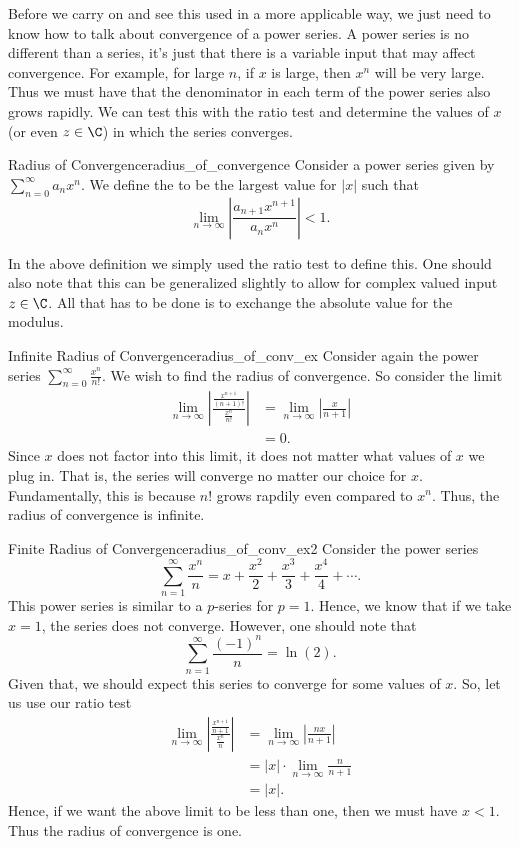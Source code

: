 Before we carry on and see this used in a more applicable way, we just need to know how to talk about convergence of a power series.  A power series is no different than a series, it's just that there is a variable input that may affect convergence.  For example, for large $n$, if $x$ is large, then $x^n$ will be very large.  Thus we must have that the denominator in each term of the power series also grows rapidly. We can test this with the ratio test and determine the values of $x$ (or even $z\in \C$) in which the series converges.

\begin{df}{Radius of Convergence}{radius_of_convergence}
Consider a power series given by $\sum_{n=0}^\infty a_n x^n$.  We define the  to be the largest value for $|x|$ such that
\[
\lim_{n\to \infty} \left| \frac{a_{n+1}x^{n+1}}{a_n x^n}\right| < 1.
\]
\end{df}

In the above definition we simply used the ratio test to define this. One should also note that this can be generalized slightly to allow for complex valued input $z\in \C$.  All that has to be done is to exchange the absolute value for the modulus.

\begin{ex}{Infinite Radius of Convergence}{radius_of_conv_ex}
Consider again the power series $\sum_{n=0}^\infty \frac{x^n}{n!}$. We wish to find the radius of convergence.  So consider the limit
\begin{align*}
    \lim_{n\to \infty} \left| \frac{\frac{x^{n+1}}{(n+1)!}}{\frac{x^n}{n!}}\right|&= \lim_{n\to \infty} \left| \frac{x}{n+1}\right|\\
    &= 0.
\end{align*}
Since $x$ does not factor into this limit, it does not matter what values of $x$ we plug in. That is, the series will converge no matter our choice for $x$. Fundamentally, this is because $n!$ grows rapdily even compared to $x^n$. Thus, the radius of convergence is infinite.
\end{ex}

\begin{ex}{Finite Radius of Convergence}{radius_of_conv_ex2}
Consider the power series
\[
\sum_{n=1}^\infty \frac{x^n}{n} = x + \frac{x^2}{2}+\frac{x^3}{3}+\frac{x^4}{4}+\cdots.
\]
This power series is similar to a $p$-series for $p=1$.  Hence, we know that if we take $x=1$, the series does not converge.  However, one should note that
\[
\sum_{n=1}^\infty \frac{(-1)^n}{n} = \ln(2).
\]
Given that, we should expect this series to converge for some values of $x$. So, let us use our ratio test 
\begin{align*}
    \lim_{n\to \infty} \left| \frac{\frac{x^{n+1}}{n+1}}{\frac{x^n}{n}}\right| &= \lim_{n\to \infty} \left| \frac{nx}{n+1} \right|\\
    &= |x| \cdot \lim_{n\to \infty} \frac{n}{n+1} \\
    &= |x|.
\end{align*}
Hence, if we want the above limit to be less than one, then we must have $x<1$. Thus the radius of convergence is one.
\end{ex}

